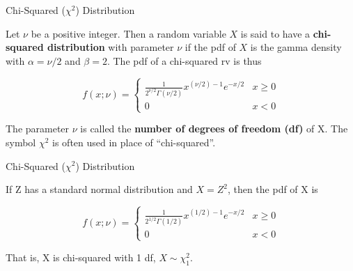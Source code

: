 \documentclass[
  ignorenonframetext,
]{beamer}
\begin{document}
\begin{frame}{Chi-Squared (\(\chi^{2}\)) Distribution}
\protect\hypertarget{chi-squared-chi2-distribution}{}
\begin{tcolorbox}[enhanced jigsaw, titlerule=0mm, colbacktitle=quarto-callout-important-color!10!white, opacityback=0, bottomrule=.15mm, colback=white, colframe=quarto-callout-important-color-frame, arc=.35mm, title=\textcolor{quarto-callout-important-color}{\faExclamation}\hspace{0.5em}{Definition}, toprule=.15mm, breakable, coltitle=black, leftrule=.75mm, bottomtitle=1mm, left=2mm, rightrule=.15mm, toptitle=1mm, opacitybacktitle=0.6]

Let \(\nu\) be a positive integer. Then a random variable \(X\) is said
to have a \textbf{chi-squared distribution} with parameter \(\nu\) if
the pdf of \(X\) is the gamma density with \(\alpha = \nu/2\) and
\(\beta=2\). The pdf of a chi-squared rv is thus

\[ 
f(x;\nu) = \begin{cases}
\frac{1}{2^{\nu/2}\Gamma(\nu/2)}x^{(\nu/2)-1}e^{-x/2} & x \geq 0 \\
0 & x < 0 
\end{cases}
\]

The parameter \(\nu\) is called the \textbf{number of degrees of freedom
(df)} of X. The symbol \(\chi^{2}\) is often used in place of
``chi-squared''.

\end{tcolorbox}
\end{frame}

\begin{frame}{Chi-Squared (\(\chi^{2}\)) Distribution}
\protect\hypertarget{chi-squared-chi2-distribution-1}{}
\begin{tcolorbox}[enhanced jigsaw, titlerule=0mm, colbacktitle=quarto-callout-important-color!10!white, opacityback=0, bottomrule=.15mm, colback=white, colframe=quarto-callout-important-color-frame, arc=.35mm, title=\textcolor{quarto-callout-important-color}{\faExclamation}\hspace{0.5em}{Proposition}, toprule=.15mm, breakable, coltitle=black, leftrule=.75mm, bottomtitle=1mm, left=2mm, rightrule=.15mm, toptitle=1mm, opacitybacktitle=0.6]

If Z has a standard normal distribution and \(X = Z^{2}\), then the pdf
of X is

\[
f(x;\nu) = \begin{cases}
\frac{1}{2^{1/2}\Gamma(1/2)}x^{(1/2)-1}e^{-x/2} & x \geq 0 \\
0 & x < 0 
\end{cases}
\]

That is, X is chi-squared with 1 df, \(X \sim \chi^{2}_{1}\).

\end{tcolorbox}
\end{frame}
\end{document}
